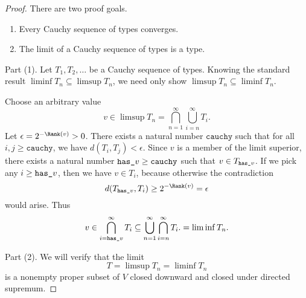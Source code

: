 \documentclass{amsart}
\begin{document}
\begin{proof}
There are two proof goals.
\begin{enumerate}
\item Every Cauchy sequence of types converges.
\item The limit of a Cauchy sequence of types is a type.
\end{enumerate}

Part (1). Let $T_1,T_2,\ldots$ be a Cauchy sequence of types.
Knowing the standard result $\liminf T_n\subseteq\limsup T_n$,
we need only show $\limsup T_n\subseteq\liminf T_n$.

\def\Cauchy{\texttt{cauchy}}
\def\Hasv{{\texttt{has\textunderscore}v}}

Choose an arbitrary value
\[
v\in \limsup T_n = \bigcap_{n=1}^\infty\bigcup_{i = n}^\infty T_i.
\]
Let $\epsilon=2^{-\Rank(v)}>0$. There exists a natural number
$\Cauchy$ such that for all $i,j\ge\Cauchy$, we have
$d(T_i,T_j)<\epsilon$. Since $v$ is a member of the limit
superior, there exists a natural number $\Hasv\ge\Cauchy$ such
that $v\in T_\Hasv$. If we pick any $i\ge\Hasv$, then we have
$v\in T_i$, because otherwise the contradiction
\[
d(T_\Hasv, T_i)\ge2^{-\Rank(v)}=\epsilon
\]
would arise. Thus
\[
v\in
\bigcap_{i=\Hasv}^\infty T_i\subseteq
\bigcup_{n=1}^\infty\bigcap_{i = n}^\infty T_i.
=\liminf T_n.
\]

Part (2). We will verify that the limit
\[
T=\limsup T_n=\liminf T_n
\]
is a nonempty proper subset of $V$ closed downward and closed
under directed supremum.
\end{proof}
\end{document}
